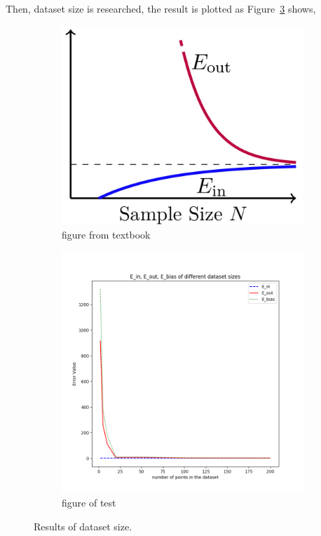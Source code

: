 \documentclass{article}
\begin{document}
Then, dataset size is researched, the result is plotted as Figure~\ref{fig:size_nonreg} shows,
\begin{figure}[h]
\centering
\begin{subfigure}{.45\textwidth}
  \centering
  \includegraphics[width=.8\linewidth]{sample_txtbook.jpg}
  \caption{\small figure from textbook}
  \label{fig:sub1}
\end{subfigure}%
\begin{subfigure}{.45\textwidth}
  \centering
  \includegraphics[width=.9\linewidth]{test_N_noreg.png}
  \caption{\small figure of test}
  \label{fig:sub2}
\end{subfigure}
\caption{\small Results of dataset size.}
\label{fig:size_nonreg}
\end{figure}
\end{document}
